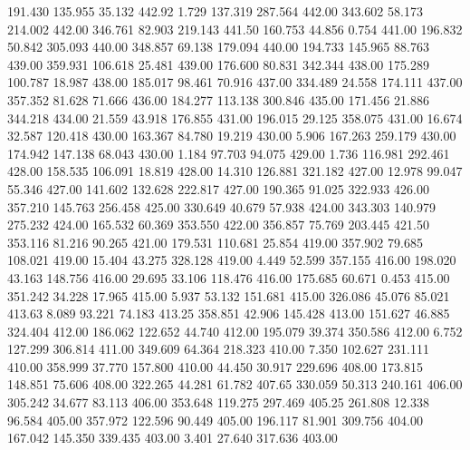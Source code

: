  191.430  135.955   35.132       442.92
   1.729  137.319  287.564       442.00
 343.602   58.173  214.002       442.00
 346.761   82.903  219.143       441.50
 160.753   44.856    0.754       441.00
 196.832   50.842  305.093       440.00
 348.857   69.138  179.094       440.00
 194.733  145.965   88.763       439.00
 359.931  106.618   25.481       439.00
 176.600   80.831  342.344       438.00
 175.289  100.787   18.987       438.00
 185.017   98.461   70.916       437.00
 334.489   24.558  174.111       437.00
 357.352   81.628   71.666       436.00
 184.277  113.138  300.846       435.00
 171.456   21.886  344.218       434.00
  21.559   43.918  176.855       431.00
 196.015   29.125  358.075       431.00
  16.674   32.587  120.418       430.00
 163.367   84.780   19.219       430.00
   5.906  167.263  259.179       430.00
 174.942  147.138   68.043       430.00
   1.184   97.703   94.075       429.00
   1.736  116.981  292.461       428.00
 158.535  106.091   18.819       428.00
  14.310  126.881  321.182       427.00
  12.978   99.047   55.346       427.00
 141.602  132.628  222.817       427.00
 190.365   91.025  322.933       426.00
 357.210  145.763  256.458       425.00
 330.649   40.679   57.938       424.00
 343.303  140.979  275.232       424.00
 165.532   60.369  353.550       422.00
 356.857   75.769  203.445       421.50
 353.116   81.216   90.265       421.00
 179.531  110.681   25.854       419.00
 357.902   79.685  108.021       419.00
  15.404   43.275  328.128       419.00
   4.449   52.599  357.155       416.00
 198.020   43.163  148.756       416.00
  29.695   33.106  118.476       416.00
 175.685   60.671    0.453       415.00
 351.242   34.228   17.965       415.00
   5.937   53.132  151.681       415.00
 326.086   45.076   85.021       413.63
   8.089   93.221   74.183       413.25
 358.851   42.906  145.428       413.00
 151.627   46.885  324.404       412.00
 186.062  122.652   44.740       412.00
 195.079   39.374  350.586       412.00
   6.752  127.299  306.814       411.00
 349.609   64.364  218.323       410.00
   7.350  102.627  231.111       410.00
 358.999   37.770  157.800       410.00
  44.450   30.917  229.696       408.00
 173.815  148.851   75.606       408.00
 322.265   44.281   61.782       407.65
 330.059   50.313  240.161       406.00
 305.242   34.677   83.113       406.00
 353.648  119.275  297.469       405.25
 261.808   12.338   96.584       405.00
 357.972  122.596   90.449       405.00
 196.117   81.901  309.756       404.00
 167.042  145.350  339.435       403.00
   3.401   27.640  317.636       403.00
